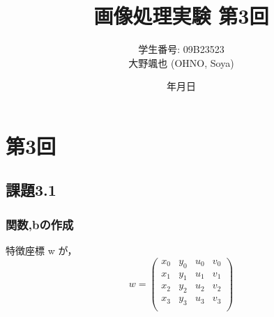 \documentclass[autodetect-engine,dvi=dvipdfmx,ja=standard,
               a4j,11pt]{bxjsarticle}
\title{画像処理実験 第3回}
\author{学生番号: 09B23523\\
        大野颯也 (OHNO, Soya)}
\date{\number\year 年\number\month 月\number\day 日}
\begin{document}
\maketitle











\section{第3回} \label{sec:abstract}
\subsection{課題3.1}
\subsubsection{関数,bの作成}
特徴座標 w が，
\[
w =
\begin{pmatrix}
x_0 & y_0 & u_0 & v_0 \\
x_1 & y_1 & u_1 & v_1 \\
x_2 & y_2 & u_2 & v_2 \\
x_3 & y_3 & u_3 & v_3 \\
\end{pmatrix}
\]
\end{document}
